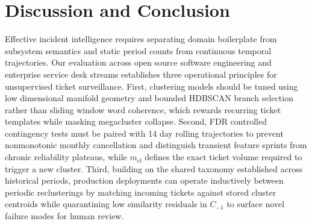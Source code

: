 \documentclass[sigconf,anonymous,pbalance]{acmart}
\begin{document}
\section{Discussion and Conclusion}
Effective incident intelligence requires separating domain boilerplate from subsystem semantics and static period counts from continuous temporal trajectories. Our evaluation across open source software engineering and enterprise service desk streams establishes three operational principles for unsupervised ticket surveillance. First, clustering models should be tuned using low dimensional manifold geometry and bounded HDBSCAN branch selection rather than sliding window word coherence, which rewards recurring ticket templates while masking megacluster collapse. Second, FDR controlled contingency tests must be paired with 14 day rolling trajectories to prevent nonmonotonic monthly cancellation and distinguish transient feature sprints from chronic reliability plateaus, while $m_{\text{cl}}$ defines the exact ticket volume required to trigger a new cluster. Third, building on the shared taxonomy established across historical periods, production deployments can operate inductively between periodic reclusterings by matching incoming tickets against stored cluster centroids while quarantining low similarity residuals in $C_{-1}$ to surface novel failure modes for human review.



\end{document}
